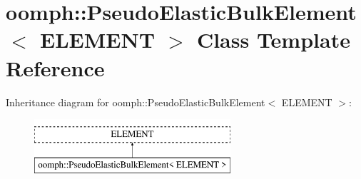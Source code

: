 \hypertarget{classoomph_1_1PseudoElasticBulkElement}{}\section{oomph\+:\+:Pseudo\+Elastic\+Bulk\+Element$<$ E\+L\+E\+M\+E\+NT $>$ Class Template Reference}
\label{classoomph_1_1PseudoElasticBulkElement}
Inheritance diagram for oomph\+:\+:Pseudo\+Elastic\+Bulk\+Element$<$ E\+L\+E\+M\+E\+NT $>$\+:\begin{figure}[H]
\begin{center}
\leavevmode
\includegraphics[height=2.000000cm]{classoomph_1_1PseudoElasticBulkElement}
\end{center}
\end{figure}
